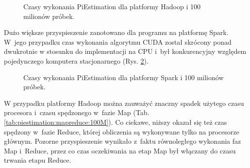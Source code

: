 \begin{figure}[h]
    \centering
    \caption{Czasy wykonania PiEstimation dla platformy Hadoop i 100 milionów próbek.}
    \label{fig:piestimation:hadoop:100M}
\end{figure}

Dużo większe przyspieszenie zanotowano dla programu na platformę Spark. W~jego przypadku czas wykonania
algorytmu CUDA został skrócony ponad dwukrotnie w stosunku do implementacji na CPU i~był konkurencyjny
względem pojedynczego komputera stacjonarnego (Rys. \ref{fig:piestimation:spark:100M}).

\begin{figure}[h!]
    \centering
    \caption{Czasy wykonania PiEstimation dla platformy Spark i 100 milionów próbek.}
    \label{fig:piestimation:spark:100M}
\end{figure}
\newpage

W przypadku platformy Hadoop można zauważyć znaczny spadek użytego czasu procesora i~czasu spędzonego
w~fazie Map (Tab. \ref{tab:piestimation:mapreduce:100M}). Co ciekawe, niższy okazał się też czas spędzony
w~fazie Reduce, której obliczenia są wykonywane tylko na procesorze głównym. Pozorne przyspieszenie wynikało
z~faktu równoległego wykonania faz Map i~Reduce, przez co czas oczekiwania na etap Map był włączany do
czasu trwania etapu Reduce.

